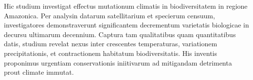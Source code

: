 Hic studium investigat effectus mutationum climatis in biodiversitatem in regione Amazonica. Per analysin datarum satellitarium et specierum censuum, investigatores demonstraverunt significantem decrementum varietatis biologicae in decursu ultimarum decennium. Captura tam qualitatibus quam quantitatibus datis, studium revelat nexus inter crescentes temperaturas, variationem precipitationis, et contractionem habitatum biodiversitatis. His inventis proponimus urgentiam conservationis iniitivarum ad mitigandam detrimenta prout climate immutat.